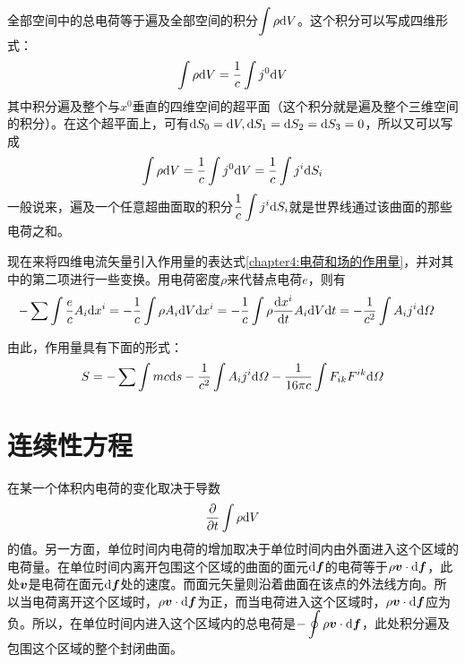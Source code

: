 全部空间中的总电荷等于遍及全部空间的积分$\displaystyle\int \rho \mathrm{d} V$。这个积分可以写成四维形式：
\begin{equation*}
	\int \rho \mathrm{d} V = \frac1c \int j^0\mathrm{d} V
\end{equation*}
其中积分遍及整个与$x^0$垂直的四维空间的超平面（这个积分就是遍及整个三维空间的积分）。在这个超平面上，可有$\mathrm{d} S_0=\mathrm{d} V, \mathrm{d} S_1=\mathrm{d} S_2=\mathrm{d} S_3=0$，所以又可以写成
\begin{equation}
	\int \rho \mathrm{d} V = \frac1c \int j^0\mathrm{d} V = \frac1c \int j^i\mathrm{d} S_i
	\label{chapter4:全空间中的总电荷}
\end{equation}
一般说来，遍及一个任意超曲面取的积分$\displaystyle\frac1c\int j^i\mathrm{d} S_i$就是世界线通过该曲面的那些电荷之和。

现在来将四维电流矢量引入作用量的表达式\eqref{chapter4:电荷和场的作用量}，并对其中的第二项进行一些变换。用电荷密度$\rho$来代替点电荷$e$，则有
\begin{align*}
	-\sum\int \frac{e}{c}A_i\mathrm{d} x^i & = -\frac1c\int \rho A_i\mathrm{d} V\mathrm{d} x^i = -\frac1c \int \rho\frac{\mathrm{d} x^i}{\mathrm{d} t} A_i\mathrm{d} V \mathrm{d} t = -\frac{1}{c^2}\int A_ij^i\mathrm{d} \varOmega
\end{align*}

由此，作用量具有下面的形式：
\begin{equation}
	S = -\sum\int mc\mathrm{d} s - \frac{1}{c^2}\int A_ij^i\mathrm{d} \varOmega - \frac{1}{16\pi c}\int F_{ik}F^{ik}\mathrm{d} \varOmega
	\label{chapter4:用四维电流表示的电磁场及其中粒子的作用量}
\end{equation}

\section{连续性方程}

在某一个体积内电荷的变化取决于导数
\begin{equation*}
	\frac{\partial}{\partial t}\int \rho \mathrm{d} V
\end{equation*}
的值。另一方面，单位时间内电荷的增加取决于单位时间内由外面进入这个区域的电荷量。在单位时间内离开包围这个区域的曲面的面元$\mathrm{d} \boldsymbol{f}$的电荷等于$\rho \boldsymbol{v}\cdot \mathrm{d} \boldsymbol{f}$，此处$\boldsymbol{v}$是电荷在面元$\mathrm{d} \boldsymbol{f}$处的速度。而面元矢量则沿着曲面在该点的外法线方向。所以当电荷离开这个区域时，$\rho \boldsymbol{v}\cdot \mathrm{d} \boldsymbol{f}$为正，而当电荷进入这个区域时，$\rho \boldsymbol{v}\cdot \mathrm{d} \boldsymbol{f}$应为负。所以，在单位时间内进入这个区域内的总电荷是$\displaystyle -\oint \rho\boldsymbol{v}\cdot \mathrm{d}\boldsymbol{f}$，此处积分遍及包围这个区域的整个封闭曲面。

